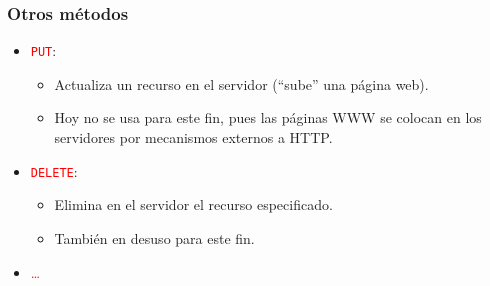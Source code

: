 \documentclass[hyperref={pdfpagelabels=true},ucs]{beamer}
\begin{document}
\begin{frame}[fragile]
\frametitle{Otros métodos}

\begin{itemize}
\item \textcolor{red}{\Verb|PUT|}:
  \begin{itemize}
  \item Actualiza un recurso en el servidor (``sube'' una página web).   
  \item Hoy no se usa para este fin, pues las páginas WWW se colocan
    en los servidores por mecanismos externos a HTTP.
  \end{itemize}

\item \textcolor{red}{\Verb|DELETE|}:
  \begin{itemize}
  \item Elimina en el servidor el recurso especificado.
  \item También en desuso para este fin.
  \end{itemize}



\item \textcolor{red}{\ldots}

\end{itemize}

\end{frame}



\end{document}
